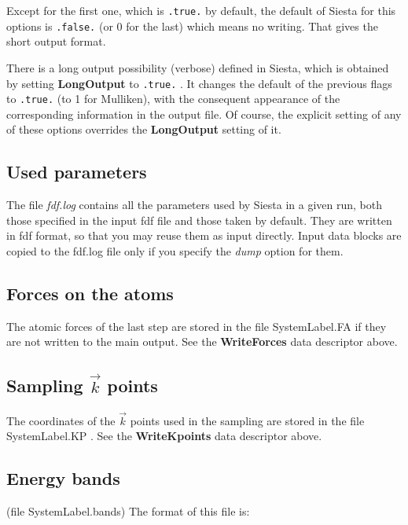 \documentclass[11pt]{article}
\begin{document}
Except for the first one, which is {\tt .true.} by default, the
default of {\sc Siesta} for this options is {\tt .false.} (or 0 for the last)
which means no writing. That gives the short output format.

There is a long output possibility (verbose) defined in {\sc Siesta}, which is
obtained by setting {\bf LongOutput} to {\tt .true.} . It changes 
the default of the previous flags to {\tt .true.} (to 1 for 
Mulliken), with the consequent appearance of the 
corresponding information in the output file.
Of course, the explicit setting of any of these options overrides the
{\bf LongOutput} setting of it.



\subsection{Used parameters}
The file {\it fdf.log} contains all the parameters used by {\sc Siesta}
in a given run, both those specified in the input fdf file and
those taken by default. They are written in fdf format, so that
you may reuse them as input directly. Input data blocks are 
copied to the fdf.log file only if you specify the {\it dump} option
for them.



\subsection{Forces on the atoms}
The atomic forces of the last step are stored in the file
SystemLabel.FA if they are not written to the main output.
See the {\bf WriteForces} data descriptor above.


\subsection{Sampling $\vec k$ points}
The coordinates of the $\vec k$ points used in the sampling
are stored in the file SystemLabel.KP .
See the {\bf WriteKpoints} data descriptor above.


\subsection{Energy bands}
(file SystemLabel.bands) The format of this file is:
\end{document}
